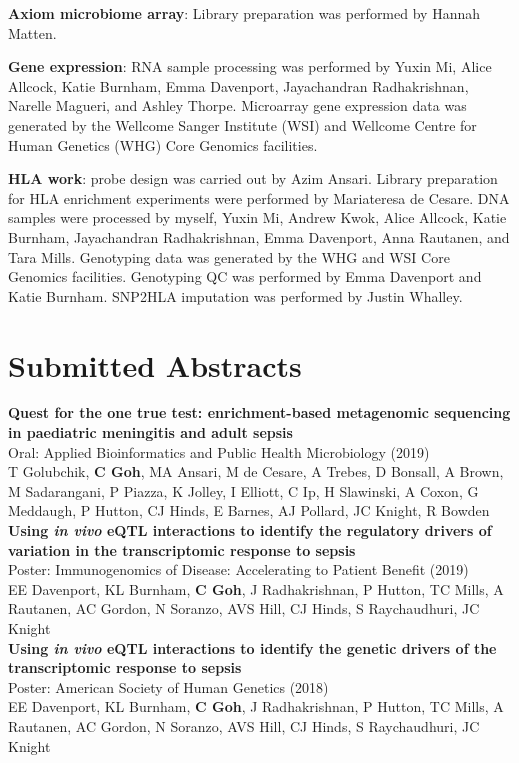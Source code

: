 \textbf{Axiom microbiome array}: Library preparation was performed by Hannah Matten.

\textbf{Gene expression}: RNA sample processing was performed by Yuxin Mi, Alice Allcock, Katie Burnham, Emma Davenport, Jayachandran Radhakrishnan, Narelle Magueri, and Ashley Thorpe. Microarray gene expression data was generated by the Wellcome Sanger Institute (WSI) and Wellcome Centre for Human Genetics (WHG) Core Genomics facilities.

\textbf{HLA work}: probe design was carried out by Azim Ansari. Library preparation for HLA enrichment experiments were performed by Mariateresa de Cesare. DNA samples were processed by myself, Yuxin Mi, Andrew Kwok, Alice Allcock, Katie Burnham, Jayachandran Radhakrishnan, Emma Davenport, Anna Rautanen, and Tara Mills. Genotyping data was generated by the WHG and WSI Core Genomics facilities. Genotyping QC was performed by Emma Davenport and Katie Burnham. SNP2HLA imputation was performed by Justin Whalley.

\newpage

\chapter*{Submitted Abstracts}
\thispagestyle{plain} %

\noindent
\textbf{Quest for the one true test: enrichment-based metagenomic sequencing in paediatric meningitis and adult sepsis}\\
Oral: Applied Bioinformatics and Public Health Microbiology (2019)\\
T Golubchik, \textbf{C Goh}, MA Ansari, M de Cesare, A Trebes, D Bonsall, A Brown, M Sadarangani, P Piazza, K Jolley, I Elliott, C Ip, H Slawinski, A Coxon, G Meddaugh, P Hutton, CJ Hinds, E Barnes, AJ Pollard, JC Knight, R Bowden\\

\textbf{Using \textit{in vivo} eQTL interactions to identify the regulatory drivers of variation in the transcriptomic response to sepsis}\\
Poster: Immunogenomics of Disease: Accelerating to Patient Benefit (2019)\\
EE Davenport, KL Burnham, \textbf{C Goh}, J Radhakrishnan, P Hutton, TC Mills, A Rautanen, AC Gordon, N Soranzo, AVS Hill, CJ Hinds, S Raychaudhuri, JC Knight\\

\textbf{Using \textit{in vivo} eQTL interactions to identify the genetic drivers of the transcriptomic response to sepsis}\\
Poster: American Society of Human Genetics (2018)\\
EE Davenport, KL Burnham, \textbf{C Goh}, J Radhakrishnan, P Hutton, TC Mills, A Rautanen, AC Gordon, N Soranzo, AVS Hill, CJ Hinds, S Raychaudhuri, JC Knight\\

